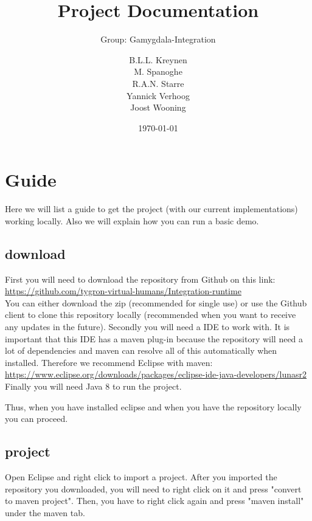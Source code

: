 \documentclass{scrartcl}
\begin{document}
\title{Project Documentation}
\subtitle{Group: Gamygdala-Integration}
\date{\today{}}

\author{
    \begin{tabular}{l r}
      B.L.L. Kreynen\\
      M. Spanoghe\\
      R.A.N. Starre\\
      Yannick Verhoog\\
      Joost Wooning\\
    \end{tabular}
}

\maketitle \thispagestyle{empty} \pagebreak

\section{Guide}
Here we will list a guide to get the project (with our current implementations) working locally. Also we will explain how you can run a basic demo.

\subsection{download}
First you will need to download the repository from Github on this link: \\
\url{https://github.com/tygron-virtual-humans/Integration-runtime}\\
You can either download the zip (recommended for single use) or use the Github client to clone this repository locally (recommended when you want to receive any updates in the future).
Secondly you will need a IDE to work with. It is important that this IDE has a maven plug-in because the repository will need a lot of dependencies and maven can resolve all of this automatically when installed. Therefore we recommend Eclipse with maven:\\
\url{https://www.eclipse.org/downloads/packages/eclipse-ide-java-developers/lunasr2}
Finally you will need Java 8 to run the project.

Thus, when you have installed eclipse and when you have the repository locally you can proceed.

\subsection{project}
Open Eclipse and right click to import a project. After you imported the repository you downloaded, you will need to right click on it and press "convert to maven project". Then, you have to right click again and press "maven install" under the maven tab.
\end{document}
